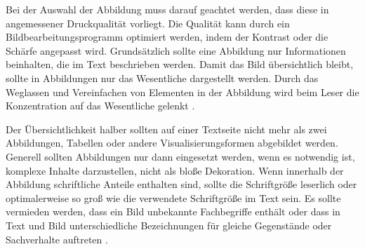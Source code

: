 Bei der Auswahl der Abbildung muss darauf geachtet werden, dass diese in angemessener Druckqualität vorliegt.
Die Qualität kann durch ein Bildbearbeitungsprogramm optimiert werden, indem der Kontrast oder die Schärfe angepasst wird.
Grundsätzlich sollte eine Abbildung nur Informationen beinhalten, die im Text beschrieben werden.
Damit das Bild übersichtlich bleibt, sollte in Abbildungen nur das Wesentliche dargestellt werden.
Durch das Weglassen und Vereinfachen von Elementen in der Abbildung wird beim Leser die Konzentration auf das Wesentliche gelenkt \cite[S.~70~f.]{Hering2009}.

Der Übersichtlichkeit halber sollten auf einer Textseite nicht mehr als zwei Abbildungen, Tabellen oder andere Visualisierungsformen abgebildet werden.
Generell sollten Abbildungen nur dann eingesetzt werden, wenn es notwendig ist, komplexe Inhalte darzustellen, nicht als bloße Dekoration.
Wenn innerhalb der Abbildung schriftliche Anteile enthalten sind, sollte die Schriftgröße leserlich oder optimalerweise so groß wie die verwendete Schriftgröße im Text sein.
Es sollte vermieden werden, dass ein Bild unbekannte Fachbegriffe enthält oder dass in Text und Bild unterschiedliche Bezeichnungen für gleiche Gegenstände oder Sachverhalte auftreten \cite[S. 80]{Hering2009}.

